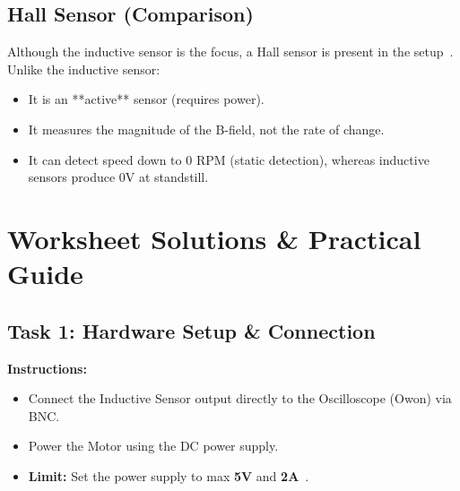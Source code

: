 \documentclass[a4paper,12pt]{article}
\begin{document}
\subsection{Hall Sensor (Comparison)}

Although the inductive sensor is the focus, a Hall sensor is present in the setup~\cite{ref5}. Unlike the inductive sensor:

\begin{itemize}

    \item It is an **active** sensor (requires power).

    \item It measures the magnitude of the B-field, not the rate of change.

    \item It can detect speed down to 0 RPM (static detection), whereas inductive sensors produce 0V at standstill.

\end{itemize}



\newpage



\section{Worksheet Solutions \& Practical Guide}



\subsection{Task 1: Hardware Setup \& Connection}

\textbf{Instructions:}

\begin{itemize}

    \item Connect the Inductive Sensor output directly to the Oscilloscope (Owon) via BNC.

    \item Power the Motor using the DC power supply.

    \item \textbf{Limit:} Set the power supply to max \textbf{5V} and \textbf{2A}~\cite{ref37}.

\end{itemize}
\end{document}
